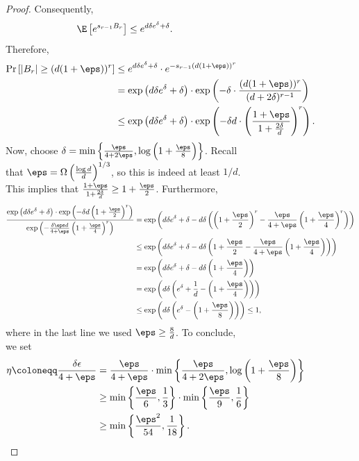 \documentclass[11pt,letterpaper]{article}
\begin{document}
\begin{figure}
\begin{figure}
\begin{proof}
    Consequently,
    \[ \E\left[ e^{s_{r-1} B_r} \right] \le e^{d\delta e^{\delta} + \delta}. \]
    Therefore,
    \begin{align*}
        \Pr\left[ |B_r| \ge (d(1+\eps))^r \right] &\le e^{d\delta e^{\delta} + \delta} \cdot e^{-s_{r-1}(d(1+\eps))^{r}} \\
            &= \exp\left(d\delta e^{\delta} + \delta\right) \cdot \exp\left( - \delta \cdot \frac{(d(1+\eps))^r}{(d+2\delta)^{r-1}} \right) \\
            &\le \exp\left(d\delta e^{\delta} + \delta\right) \cdot \exp\left( - \delta d \cdot \left( \frac{1+\eps}{1+\frac{2\delta}{d}} \right)^r \right).
    \end{align*}
    Now, choose $\delta = \min\left\{\frac{\eps}{4+2\eps} , \log\left( 1 + \frac{\eps}{8} \right)\right\}$. Recall that $\eps = \Omega\left( \frac{\log d}{d} \right)^{1/3}$, so this is indeed at least $1/d$. This implies that $\frac{1+\eps}{1+\frac{2\delta}{d}} \ge 1 + \frac{\eps}{2}$. Furthermore,
    \begin{align*}
        \frac{\exp\left( d \delta e^{\delta} + \delta \right) \cdot \exp\left( - \delta d \left( 1 + \frac{\eps}{2} \right)^r \right)}{ \exp\left( - \frac{\delta\eps d}{4+\eps} \left( 1 + \frac{\eps}{4} \right)^r \right) } &= \exp\left( d \delta e^{\delta} + \delta - d \delta \left(\left( 1 + \frac{\eps}{2} \right)^r - \frac{\eps}{4+\eps} \left( 1 + \frac{\eps}{4} \right)^r \right) \right) \\
            &\le \exp\left( d \delta e^{\delta} + \delta - d \delta \left( 1 + \frac{\eps}{2} - \frac{\eps}{4+\eps} \left( 1 + \frac{\eps}{4} \right) \right) \right) \\
            &= \exp\left( d \delta e^{\delta} + \delta - d \delta \left( 1 + \frac{\eps}{4} \right) \right) \\
            &= \exp\left( d \delta \left( e^{\delta} + \frac{1}{d} - \left( 1 + \frac{\eps}{4} \right) \right) \right) \\
            &\le \exp\left( d \delta \left( e^{\delta} - \left( 1 + \frac{\eps}{8} \right) \right) \right) \le 1,
    \end{align*}
    where in the last line we used $\eps \ge \frac{8}{d}$.
    To conclude, we set
    \begin{align*}
        \eta \coloneqq \frac{\delta \epsilon}{4+\eps} &= \frac{\eps}{4+\eps} \cdot \min \left\{ \frac{\eps}{4+2\eps} , \log \left( 1 + \frac{\eps}{8} \right) \right\} \\
        &\ge \min \left\{ \frac{\eps}{6} , \frac{1}{3} \right\} \cdot \min \left\{ \frac{\eps}{9} , \frac{1}{6} \right\} \\
            &\ge \min\left\{ \frac{\eps^2}{54} , \frac{1}{18} \right\}. \qedhere
    \end{align*}
\end{proof}


\end{figure}
\end{figure}
\end{document}
